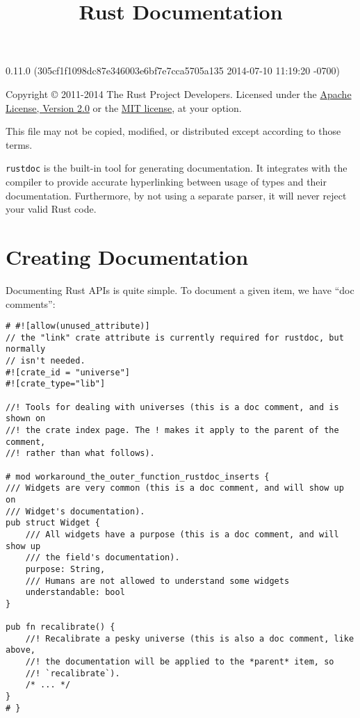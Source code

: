 \documentclass[]{article}
\title{Rust Documentation}
\begin{document}
\maketitle

0.11.0 (305cf1f1098dc87e346003e6bf7e7cca5705a135 2014-07-10 11:19:20 -0700)

Copyright © 2011-2014 The Rust Project Developers. Licensed under the
\href{http://www.apache.org/licenses/LICENSE-2.0}{Apache License,
Version 2.0} or the \href{http://opensource.org/licenses/MIT}{MIT
license}, at your option.

This file may not be copied, modified, or distributed except according
to those terms.

{
\hypersetup{linkcolor=black}
\setcounter{tocdepth}{3}
\tableofcontents
}
\texttt{rustdoc} is the built-in tool for generating documentation. It
integrates with the compiler to provide accurate hyperlinking between
usage of types and their documentation. Furthermore, by not using a
separate parser, it will never reject your valid Rust code.

\section{Creating Documentation}\label{creating-documentation}

Documenting Rust APIs is quite simple. To document a given item, we have
``doc comments'':

\begin{verbatim}
# #![allow(unused_attribute)]
// the "link" crate attribute is currently required for rustdoc, but normally
// isn't needed.
#![crate_id = "universe"]
#![crate_type="lib"]

//! Tools for dealing with universes (this is a doc comment, and is shown on
//! the crate index page. The ! makes it apply to the parent of the comment,
//! rather than what follows).

# mod workaround_the_outer_function_rustdoc_inserts {
/// Widgets are very common (this is a doc comment, and will show up on
/// Widget's documentation).
pub struct Widget {
    /// All widgets have a purpose (this is a doc comment, and will show up
    /// the field's documentation).
    purpose: String,
    /// Humans are not allowed to understand some widgets
    understandable: bool
}

pub fn recalibrate() {
    //! Recalibrate a pesky universe (this is also a doc comment, like above,
    //! the documentation will be applied to the *parent* item, so
    //! `recalibrate`).
    /* ... */
}
# }
\end{verbatim}
\end{document}
